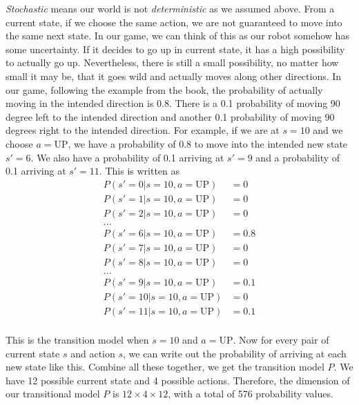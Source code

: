 \documentclass[
	letterpaper
]{article}
\begin{document}
\textit{Stochastic} means our world is not \textit{deterministic} as we assumed above. 
From a current state, if we choose the same action, we are not guaranteed to move into the same next state. 
In our game, we can think of this as our robot somehow has some uncertainty.
If it decides to go up in current state, it has a high possibility to actually go up.
Nevertheless, there is still a small possibility, no matter how small it may be, that it goes wild and actually moves along other directions.
In our game, following the example from the book, the probability of actually moving in the intended direction is 0.8.
There is a 0.1 probability of moving 90 degree left to the intended direction and another 0.1 probability of moving 90 degrees right to the intended direction.
For example, if we are at $s = 10$ and we choose $a = \text{UP}$, we have a probability of 0.8 to move into the intended new state $s' = 6$.
We also have a probability of 0.1 arriving at $s' = 9$ and a probability of 0.1 arriving at $s' = 11$.
This is written as
\begin{equation}
\begin{split}
P(s' = 0| s = 10, a = \text{UP}) &= 0\\
P(s' = 1| s = 10, a = \text{UP}) &= 0\\
P(s' = 2| s = 10, a = \text{UP}) &= 0\\
...&\\
P(s' = 6| s = 10, a = \text{UP}) &= 0.8\\
P(s' = 7| s = 10, a = \text{UP}) &= 0\\
P(s' = 8| s = 10, a = \text{UP}) &= 0\\
...&\\
P(s' = 9| s = 10, a = \text{UP}) &= 0.1\\
P(s' = 10| s = 10, a = \text{UP}) &= 0\\
P(s' = 11| s = 10, a = \text{UP}) &= 0.1\\
\end{split}
\end{equation}

This is the transition model when $s = 10$ and $a = \text{UP}$.
Now for every pair of current state $s$ and action $s$, we can write out the probability of arriving at each new state like this.
Combine all these together, we get the transition model $P$.
We have 12 possible current state and 4 possible actions.
Therefore, the dimension of our transitional model $P$ is $12 \times 4 \times 12$, with a total of 576 probability values.
\end{document}
